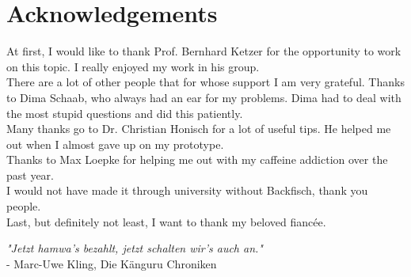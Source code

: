 \chapter*{Acknowledgements}
\label{sec:ack}
At first, I would like to thank Prof. Bernhard Ketzer for the opportunity to work on this topic. I really enjoyed my work in his group.\\
There are a lot of other people that for whose support I am very grateful.
Thanks to Dima Schaab, who always had an ear for my problems. Dima had to deal with the most stupid questions and did this patiently.\\
Many thanks go to Dr. Christian Honisch for a lot of useful tips. He helped me out when I almost gave up on my prototype.\\
Thanks to Max Loepke for helping me out with my caffeine addiction over the past year.\\
I would not have made it through university without Backfisch, thank you people.\\

Last, but definitely not least, I want to thank my beloved fiancée. 

\vspace{3cm}
%
%

\begin{center}
	\textit{"Jetzt hamwa's bezahlt, jetzt schalten wir's auch an."}\\
	\hspace{1.5cm}- Marc-Uwe Kling, Die Känguru Chroniken
\end{center}


